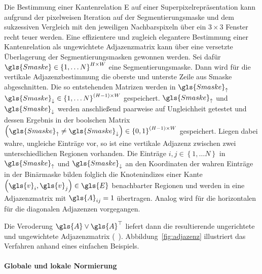 Die Bestimmung einer Kantenrelation \gls{E} auf einer Superpixelrepräsentation kann aufgrund der pixelweisen Iteration auf der Segmentierungsmaske und dem sukzessiven Vergleich mit den jeweiligen Nachbarspixeln über ein $3 \times 3$ Fenster recht teuer werden.
Eine effizientere und zugleich elegantere Bestimmung einer Kantenrelation als ungewichtete Adjazenzmatrix kann über eine versetzte Überlagerung der Segmentierungsmasken gewonnen werden.
Sei dafür $\gls{Smaske} \in {\left\{1, \ldots N\right\}}^{H \times W}$ eine Segmentierungsmaske.
Dann wird für die vertikale Adjazenzbestimmung die oberste und unterste Zeile aus \gls{Smaske} abgeschnitten.
Die so entstehenden Matrizen werden in $\gls{Smaske}_{\uparrow}$ \bzw{} $\gls{Smaske}_{\downarrow} \in {\left\{1, \ldots N\right\}}^{\left(H-1\right) \times W}$ gespeichert.
$\gls{Smaske}_{\uparrow}$ und $\gls{Smaske}_{\downarrow}$ werden anschließend paarweise auf Ungleichheit getestet und dessen Ergebnis in der boolschen Matrix $\left(\gls{Smaske}_{\uparrow} \neq \gls{Smaske}_{\downarrow}\right) \in {\left\{0, 1\right\}}^{\left(H-1\right) \times W}$ gespeichert.
Liegen dabei wahre, \dhe{} ungleiche Einträge vor, so ist eine vertikale Adjazenz zwischen zwei unterschiedlichen Regionen vorhanden.
Die Einträge $i,j \in \left\{1, \ldots N \right\}$ in $\gls{Smaske}_{\uparrow}$ und $\gls{Smaske}_{\downarrow}$ an den Koordinaten der wahren Einträge in der Binärmaske bilden folglich die Knotenindizes einer Kante $\left(\gls{v}_i, \gls{v}_j\right) \in \gls{E}$ benachbarter Regionen und werden in eine Adjazenzmatrix mit $\gls{A}_{ij}=1$ übertragen.
Analog wird für die horizontalen \bzw{} für die diagonalen Adjazenzen vorgegangen.

Die Veroderung $\gls{A} \vee \gls{A}^{\top}$ liefert dann die resultierende ungerichtete und ungewichtete Adjazenzmatrix (\vgl{}~\cite{stackoverflow}).
Abbildung~\ref{fig:adjazenz} illustriert das Verfahren anhand eines einfachen Beispiels.

\paragraph{Globale und lokale Normierung}
\label{globale_lokale_normierung}


